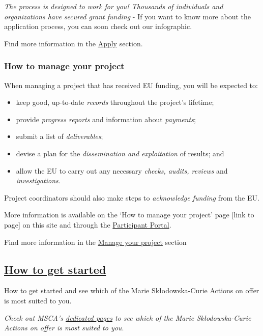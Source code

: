 \documentclass[oneside]{book}
\numberwithin{equation}{section}
\begin{document}
\textit{The process is designed to work for you! Thousands of individuals and organizations have secured grant funding} - If you want to know more about the application process, you can soon check out our infographic.

%
Find more information in the \href{https://ec.europa.eu/research/mariecurieactions/how-to/apply_en}{Apply} section.

\subsubsection{How to manage your project}
When managing a project that has received EU funding, you will be expected to:
\begin{itemize}
    \item keep good, up-to-date \textit{records} throughout the project's lifetime;
    \item provide \textit{progress reports} and information about \textit{payments};
    \item submit a list of \textit{deliverables};
    \item devise a plan for the \textit{dissemination and exploitation} of results; and
    \item allow the EU to carry out any necessary \textit{checks, audits, reviews} and \textit{investigations}.
\end{itemize}
Project coordinators should also make steps to \textit{acknowledge funding} from the EU.

%
More information is available on the `How to manage your project' page [link to page] on this site and through the \href{http://ec.europa.eu/research/participants/docs/h2020-funding-guide/grants/grant-management_en.htm}{Participant Portal}.

Find more information in the \href{https://ec.europa.eu/research/mariecurieactions/how-to/manage-your-project_en}{Manage your project} section

\subsection{\href{https://ec.europa.eu/research/mariecurieactions/how-to/get-started_en}{How to get started}}
\begin{center}
    How to get started and see which of the Marie Skłodowska-Curie Actions on offer is most suited to you.
\end{center}
\textit{Check out MSCA's \href{https://ec.europa.eu/research/mariecurieactions/msca-actions_en}{dedicated pages} to see which of the Marie Skłodowska-Curie Actions on offer is most suited to you}.
\end{document}

